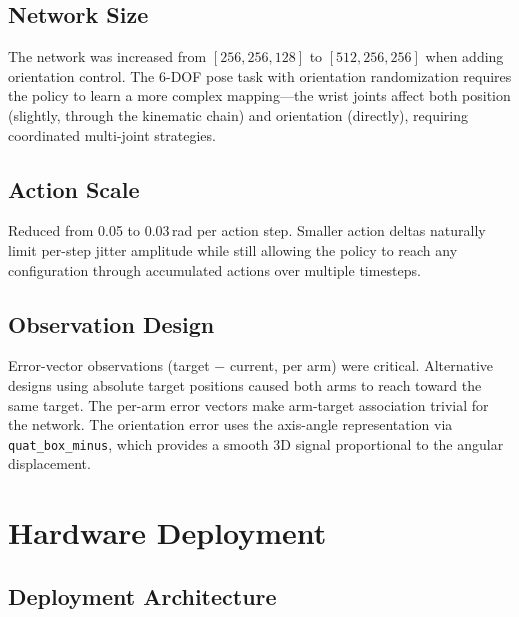 \documentclass[11pt,a4paper]{article}
\begin{document}
\subsection{Network Size}
The network was increased from $[256, 256, 128]$ to $[512, 256, 256]$ when adding orientation control. The 6-DOF pose task with orientation randomization requires the policy to learn a more complex mapping---the wrist joints affect both position (slightly, through the kinematic chain) and orientation (directly), requiring coordinated multi-joint strategies.

\subsection{Action Scale}
Reduced from 0.05 to 0.03\,rad per action step. Smaller action deltas naturally limit per-step jitter amplitude while still allowing the policy to reach any configuration through accumulated actions over multiple timesteps.

\subsection{Observation Design}
Error-vector observations (target $-$ current, per arm) were critical. Alternative designs using absolute target positions caused both arms to reach toward the same target. The per-arm error vectors make arm-target association trivial for the network. The orientation error uses the axis-angle representation via \texttt{quat\_box\_minus}, which provides a smooth 3D signal proportional to the angular displacement.

\section{Hardware Deployment}
\label{sec:deployment}

\subsection{Deployment Architecture}
\end{document}
